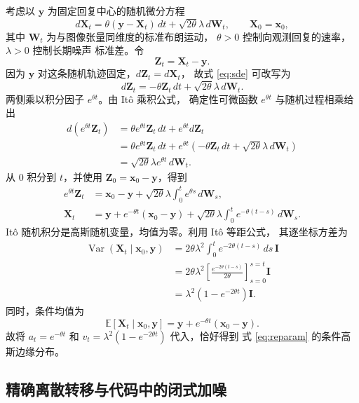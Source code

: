 \documentclass[UTF8,a4paper,12pt]{ctexart}
\begin{document}
考虑以 \(\bm{y}\) 为固定回复中心的随机微分方程
\begin{equation}
  d\bm{X}_t
  =
  \theta(\bm{y}-\bm{X}_t)\,dt
  +\sqrt{2\theta}\lambda\,d\bm{W}_t,
  \qquad
  \bm{X}_0=\bm{x}_0,
  \label{eq:sde}
\end{equation}
其中 \(\bm{W}_t\) 为与图像张量同维度的标准布朗运动，
\(\theta>0\) 控制向观测回复的速率，\(\lambda>0\) 控制长期噪声
标准差。令
\[
  \bm{Z}_t=\bm{X}_t-\bm{y}.
\]
因为 \(\bm{y}\) 对这条随机轨迹固定，\(d\bm{Z}_t=d\bm{X}_t\)，
故式 \eqref{eq:sde} 可改写为
\[
  d\bm{Z}_t=-\theta\bm{Z}_t\,dt
  +\sqrt{2\theta}\lambda\,d\bm{W}_t.
\]
两侧乘以积分因子 \(e^{\theta t}\)。由 It\^o 乘积公式，
确定性可微函数 \(e^{\theta t}\) 与随机过程相乘给出
\begin{align}
  d\!\left(e^{\theta t}\bm{Z}_t\right)
  &=\theta e^{\theta t}\bm{Z}_t\,dt
    +e^{\theta t}d\bm{Z}_t
  \\
  &=\theta e^{\theta t}\bm{Z}_t\,dt
    +e^{\theta t}
       \left(-\theta\bm{Z}_t\,dt
       +\sqrt{2\theta}\lambda\,d\bm{W}_t\right)
  \\
  &=\sqrt{2\theta}\lambda e^{\theta t}\,d\bm{W}_t.
\end{align}
从 \(0\) 积分到 \(t\)，并使用
\(\bm{Z}_0=\bm{x}_0-\bm{y}\)，得到
\begin{align}
  e^{\theta t}\bm{Z}_t
  &=\bm{x}_0-\bm{y}
    +\sqrt{2\theta}\lambda
      \int_0^t e^{\theta s}\,d\bm{W}_s,
  \\
  \bm{X}_t
  &=\bm{y}+e^{-\theta t}(\bm{x}_0-\bm{y})
    +\sqrt{2\theta}\lambda
      \int_0^t e^{-\theta(t-s)}\,d\bm{W}_s.
  \label{eq:ou-solution}
\end{align}
It\^o 随机积分是高斯随机变量，均值为零。利用 It\^o 等距公式，
其逐坐标方差为
\begin{align}
  \operatorname{Var}(\bm{X}_t\mid\bm{x}_0,\bm{y})
  &=2\theta\lambda^2
    \int_0^t e^{-2\theta(t-s)}\,ds\,\bm{I}
  \\
  &=2\theta\lambda^2
    \left[
      \frac{e^{-2\theta(t-s)}}{2\theta}
    \right]_{s=0}^{s=t}\bm{I}
  \\
  &=\lambda^2(1-e^{-2\theta t})\bm{I}.
\end{align}
同时，条件均值为
\[
  \mathbb{E}[\bm{X}_t\mid\bm{x}_0,\bm{y}]
  =\bm{y}+e^{-\theta t}(\bm{x}_0-\bm{y}).
\]
故将 \(a_t=e^{-\theta t}\) 和
\(v_t=\lambda^2(1-e^{-2\theta t})\) 代入，恰好得到
式 \eqref{eq:reparam} 的条件高斯边缘分布。

\subsection{精确离散转移与代码中的闭式加噪}
\end{document}
